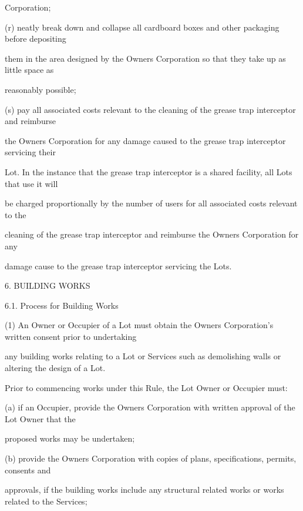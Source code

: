 \documentclass{article}
\begin{document}
{\fontsize{10.02}{1}Corporation; }

{\fontsize{9.962}{1}(r) neatly break down and collapse all cardboard boxes and other packaging before depositing }

{\fontsize{10.02}{1}them in the area designed by the Owners Corporation so that they take up as little space as }

{\fontsize{10.02}{1}reasonably possible; }

{\fontsize{9.962}{1}(s) pay all associated costs relevant to the cleaning of the grease trap interceptor and reimburse }

{\fontsize{10.02}{1}the Owners Corporation for any damage caused to the grease trap interceptor servicing their }

{\fontsize{10.02}{1}Lot. In the instance that the grease trap interceptor is a shared facility, all Lots that use it will }

{\fontsize{10.02}{1}be charged proportionally by the number of users for all associated costs relevant to the }

{\fontsize{10.02}{1}cleaning of the grease trap interceptor and reimburse the Owners Corporation for any }

{\fontsize{10.02}{1}damage cause to the grease trap interceptor servicing the Lots. }


{\fontsize{9.99}{1}6. BUILDING WORKS }

{\fontsize{9.99}{1}6.1. Process for Building Works }

{\fontsize{9.962}{1}(1) An Owner or Occupier of a Lot must obtain the Owners Corporation’s written consent prior to undertaking }

{\fontsize{10.02}{1}any building works relating to a Lot or Services such as demolishing walls or altering the design of a Lot. }

{\fontsize{10.02}{1}Prior to commencing works under this Rule, the Lot Owner or Occupier must: }

{\fontsize{9.962}{1}(a) if an Occupier, provide the Owners Corporation with written approval of the Lot Owner that the }

{\fontsize{10.02}{1}proposed works may be undertaken; }

{\fontsize{9.962}{1}(b) provide the Owners Corporation with copies of plans, specifications, permits, consents and }

{\fontsize{10.02}{1}approvals, if the building works include any structural related works or works related to the Services; }
\end{document}
